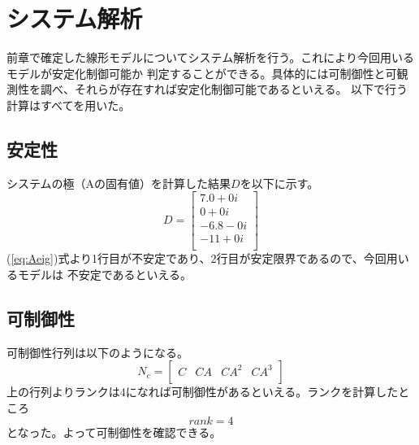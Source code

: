 \section{システム解析}
	前章で確定した線形モデルについてシステム解析を行う。これにより今回用いるモデルが安定化制御可能か
	判定することができる。具体的には可制御性と可観測性を調べ、それらが存在すれば安定化制御可能であるといえる。
	以下で行う計算はすべて\MaTX{}を用いた。
	\subsection{安定性}
		システムの極（Aの固有値）を計算した結果$D$を以下に示す。
		\begin{equation}
			D=\left[
			\begin{array}{c}
				7.0+0i\\
				0+0i \\
				-6.8-0i \\
				-11+0i\\
			\end{array}
			\right]
			\label{eq:Aeig}
		\end{equation}
		(\ref{eq:Aeig})式より1行目が不安定であり、2行目が安定限界であるので、今回用いるモデルは
		不安定であるといえる。
	\subsection{可制御性}
		可制御性行列は以下のようになる。
		\begin{equation}
			N_{c} = \left[
			\begin{array}{cccc}
				C & CA & CA^{2} & CA^{3} \\
			\end{array}
			\right]
		\end{equation}
		上の行列よりランクは4になれば可制御性があるといえる。ランクを計算したところ
		\begin{equation}
			rank  = 4
		\end{equation}
		となった。よって可制御性を確認できる。\\
